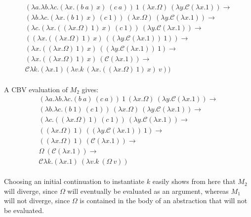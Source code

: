 \documentclass[a4paper,10pt]{article}
\begin{document}
\begin{eqnarray}
 (\lambda a . \lambda b . \lambda c . (\lambda x . (b\ a)\ x)\ (c\ a))\ 
1\ (\lambda x . \Omega)\ (\lambda y . \mathcal{C}(\lambda x . 1)) \rightarrow\\
% 
(\lambda b . \lambda c . (\lambda x . (b\ 1)\ x)\ (c\ 1))\ 
(\lambda x . \Omega)\ (\lambda y . \mathcal{C}(\lambda x . 1)) \rightarrow\\
%
(\lambda c . (\lambda x . ((\lambda x . \Omega)\ 1)\ x)\ (c\ 1))\ 
(\lambda y . \mathcal{C}(\lambda x . 1)) \rightarrow \\
%
((\lambda x . ((\lambda x . \Omega)\ 1)\ x)\ ((\lambda y . \mathcal{C} (\lambda x . 1))\ 1))\rightarrow\\
%
(\lambda x. ((\lambda x . \Omega)\ 1)\ x)\ ((\lambda y . \mathcal{C} (\lambda x . 1))\ 1)\rightarrow\\
%
(\lambda x. ((\lambda x . \Omega)\ 1)\ x)\ (\mathcal{C} (\lambda x . 1)) \rightarrow\\
%
\mathcal{C} \lambda k . (\lambda x . 1) (\lambda v . k\ (\lambda x. ((\lambda x . \Omega)\ 1)\ x)\ v))
%
\end{eqnarray}
\\
A CBV evaluation of $M_2$ gives:\\

\begin{eqnarray}
%
(\lambda a . \lambda b . \lambda c . (b\ a)\ (c\ a))\ 1\ (\lambda x . \Omega)\ (\lambda y .
\mathcal{C} (\lambda x . 1)) \rightarrow\\
%
(\lambda b . \lambda c . (b\ 1)\ (c\ 1))\ (\lambda x . \Omega)\ (\lambda y .
\mathcal{C} (\lambda x . 1)) \rightarrow \\
%
(\lambda c . ((\lambda x . \Omega)\ 1)\ (c\ 1))\ (\lambda y .
\mathcal{C} (\lambda x . 1)) \rightarrow \\
%
((\lambda x . \Omega)\ 1)\ ((\lambda y .
\mathcal{C} (\lambda x . 1))\ 1) \rightarrow \\
%
((\lambda x . \Omega)\ 1)\ 
(\mathcal{C} (\lambda x . 1)) \rightarrow \\
%
\Omega\ 
(\mathcal{C} (\lambda x . 1)) \rightarrow \\
%
\mathcal{C} \lambda k . (\lambda x . 1)\ (\lambda v . k\ (\Omega\ v))
\end{eqnarray}
\\
Choosing an initial continuation to instantiate $k$ easily shows from here that $M_2$ will diverge,
since $\Omega$ will eventually be evaluated as an argument, whereas $M_1$ will not diverge, since
$\Omega$ is contained in the body of an abstraction that will not be evaluated.\\
\end{document}
